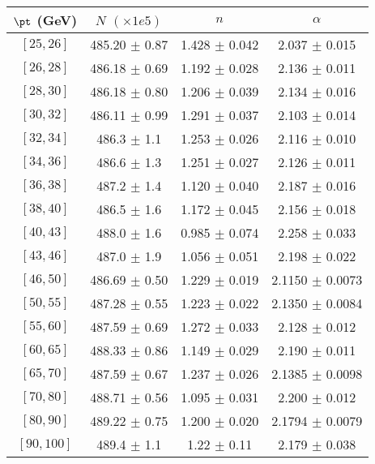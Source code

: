 \begin{tabular}{c||c|c|c}
$\pt$ (GeV) & $N$ $(\times1e5)$ & $n$ & $\alpha$ \\
\hline
$[25, 26]$ & 485.20 $\pm$ 0.87 & 1.428 $\pm$ 0.042 & 2.037 $\pm$ 0.015\\
$[26, 28]$ & 486.18 $\pm$ 0.69 & 1.192 $\pm$ 0.028 & 2.136 $\pm$ 0.011\\
$[28, 30]$ & 486.18 $\pm$ 0.80 & 1.206 $\pm$ 0.039 & 2.134 $\pm$ 0.016\\
$[30, 32]$ & 486.11 $\pm$ 0.99 & 1.291 $\pm$ 0.037 & 2.103 $\pm$ 0.014\\
$[32, 34]$ & 486.3 $\pm$ 1.1 & 1.253 $\pm$ 0.026 & 2.116 $\pm$ 0.010\\
$[34, 36]$ & 486.6 $\pm$ 1.3 & 1.251 $\pm$ 0.027 & 2.126 $\pm$ 0.011\\
$[36, 38]$ & 487.2 $\pm$ 1.4 & 1.120 $\pm$ 0.040 & 2.187 $\pm$ 0.016\\
$[38, 40]$ & 486.5 $\pm$ 1.6 & 1.172 $\pm$ 0.045 & 2.156 $\pm$ 0.018\\
$[40, 43]$ & 488.0 $\pm$ 1.6 & 0.985 $\pm$ 0.074 & 2.258 $\pm$ 0.033\\
$[43, 46]$ & 487.0 $\pm$ 1.9 & 1.056 $\pm$ 0.051 & 2.198 $\pm$ 0.022\\
$[46, 50]$ & 486.69 $\pm$ 0.50 & 1.229 $\pm$ 0.019 & 2.1150 $\pm$ 0.0073\\
$[50, 55]$ & 487.28 $\pm$ 0.55 & 1.223 $\pm$ 0.022 & 2.1350 $\pm$ 0.0084\\
$[55, 60]$ & 487.59 $\pm$ 0.69 & 1.272 $\pm$ 0.033 & 2.128 $\pm$ 0.012\\
$[60, 65]$ & 488.33 $\pm$ 0.86 & 1.149 $\pm$ 0.029 & 2.190 $\pm$ 0.011\\
$[65, 70]$ & 487.59 $\pm$ 0.67 & 1.237 $\pm$ 0.026 & 2.1385 $\pm$ 0.0098\\
$[70, 80]$ & 488.71 $\pm$ 0.56 & 1.095 $\pm$ 0.031 & 2.200 $\pm$ 0.012\\
$[80, 90]$ & 489.22 $\pm$ 0.75 & 1.200 $\pm$ 0.020 & 2.1794 $\pm$ 0.0079\\
$[90, 100]$ & 489.4 $\pm$ 1.1 & 1.22 $\pm$ 0.11 & 2.179 $\pm$ 0.038\\
\end{tabular}
